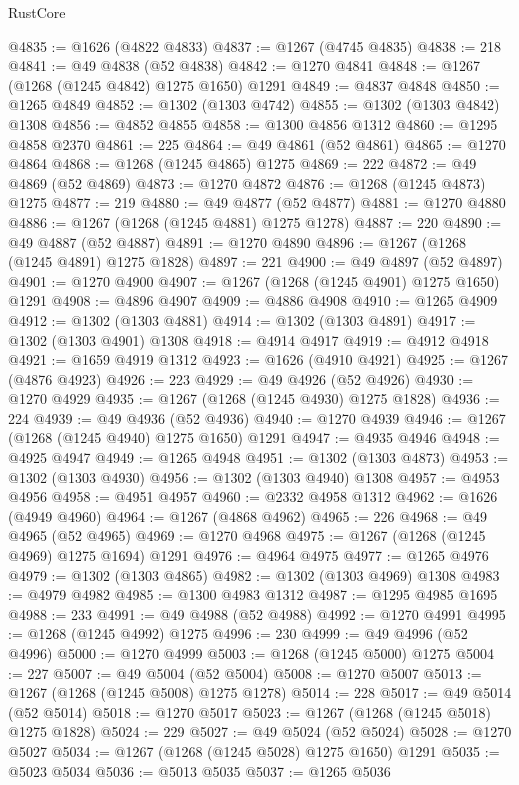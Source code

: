 \begin{lexlean}{RustCore}
\begin{coremodule}
@4835 := @1626 (@4822 @4833)
@4837 := @1267 (@4745 @4835)
@4838 := 218
@4841 := @49 @4838 (@52 @4838)
@4842 := @1270 @4841
@4848 := @1267 (@1268 (@1245 @4842) @1275 @1650) @1291
@4849 := @4837 @4848
@4850 := @1265 @4849
@4852 := @1302 (@1303 @4742)
@4855 := @1302 (@1303 @4842) @1308
@4856 := @4852 @4855
@4858 := @1300 @4856 @1312
@4860 := @1295 @4858 @2370
@4861 := 225
@4864 := @49 @4861 (@52 @4861)
@4865 := @1270 @4864
@4868 := @1268 (@1245 @4865) @1275
@4869 := 222
@4872 := @49 @4869 (@52 @4869)
@4873 := @1270 @4872
@4876 := @1268 (@1245 @4873) @1275
@4877 := 219
@4880 := @49 @4877 (@52 @4877)
@4881 := @1270 @4880
@4886 := @1267 (@1268 (@1245 @4881) @1275 @1278)
@4887 := 220
@4890 := @49 @4887 (@52 @4887)
@4891 := @1270 @4890
@4896 := @1267 (@1268 (@1245 @4891) @1275 @1828)
@4897 := 221
@4900 := @49 @4897 (@52 @4897)
@4901 := @1270 @4900
@4907 := @1267 (@1268 (@1245 @4901) @1275 @1650) @1291
@4908 := @4896 @4907
@4909 := @4886 @4908
@4910 := @1265 @4909
@4912 := @1302 (@1303 @4881)
@4914 := @1302 (@1303 @4891)
@4917 := @1302 (@1303 @4901) @1308
@4918 := @4914 @4917
@4919 := @4912 @4918
@4921 := @1659 @4919 @1312
@4923 := @1626 (@4910 @4921)
@4925 := @1267 (@4876 @4923)
@4926 := 223
@4929 := @49 @4926 (@52 @4926)
@4930 := @1270 @4929
@4935 := @1267 (@1268 (@1245 @4930) @1275 @1828)
@4936 := 224
@4939 := @49 @4936 (@52 @4936)
@4940 := @1270 @4939
@4946 := @1267 (@1268 (@1245 @4940) @1275 @1650) @1291
@4947 := @4935 @4946
@4948 := @4925 @4947
@4949 := @1265 @4948
@4951 := @1302 (@1303 @4873)
@4953 := @1302 (@1303 @4930)
@4956 := @1302 (@1303 @4940) @1308
@4957 := @4953 @4956
@4958 := @4951 @4957
@4960 := @2332 @4958 @1312
@4962 := @1626 (@4949 @4960)
@4964 := @1267 (@4868 @4962)
@4965 := 226
@4968 := @49 @4965 (@52 @4965)
@4969 := @1270 @4968
@4975 := @1267 (@1268 (@1245 @4969) @1275 @1694) @1291
@4976 := @4964 @4975
@4977 := @1265 @4976
@4979 := @1302 (@1303 @4865)
@4982 := @1302 (@1303 @4969) @1308
@4983 := @4979 @4982
@4985 := @1300 @4983 @1312
@4987 := @1295 @4985 @1695
@4988 := 233
@4991 := @49 @4988 (@52 @4988)
@4992 := @1270 @4991
@4995 := @1268 (@1245 @4992) @1275
@4996 := 230
@4999 := @49 @4996 (@52 @4996)
@5000 := @1270 @4999
@5003 := @1268 (@1245 @5000) @1275
@5004 := 227
@5007 := @49 @5004 (@52 @5004)
@5008 := @1270 @5007
@5013 := @1267 (@1268 (@1245 @5008) @1275 @1278)
@5014 := 228
@5017 := @49 @5014 (@52 @5014)
@5018 := @1270 @5017
@5023 := @1267 (@1268 (@1245 @5018) @1275 @1828)
@5024 := 229
@5027 := @49 @5024 (@52 @5024)
@5028 := @1270 @5027
@5034 := @1267 (@1268 (@1245 @5028) @1275 @1650) @1291
@5035 := @5023 @5034
@5036 := @5013 @5035
@5037 := @1265 @5036

\end{coremodule}
\end{lexlean}
